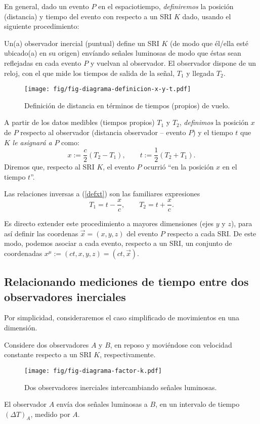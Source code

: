 En general, dado un evento $P$ en el espaciotiempo, \textit{definiremos} la posición (distancia) y tiempo del evento con respecto a un SRI $K$ dado, usando el siguiente procedimiento:

Un(a) observador inercial (puntual) define un SRI $K$ (de modo que él/ella esté  ubicado(a) en su origen) envíando señales luminosas de modo que éstas sean reflejadas en cada evento $P$ y vuelvan al observador. El observador dispone de un reloj,  con el que mide los tiempos de salida de la señal, $T_1$
y llegada $T_2$.
\begin{figure}[!h]
\centerline{\texttt{[image: fig/fig-diagrama-definicion-x-y-t.pdf]}}
 \caption{Definición de distancia en términos de tiempos (propios) de vuelo.}
\label{defdist}
\end{figure}
A partir de los datos medibles (tiempos propios) $T_1$ y $T_2$, \textit{definimos} la posición
$x$ de $P$ respecto al observador (distancia observador -- evento $P$) y el
tiempo $t$ que $K$ \textit{le asignará a} $P$ como:
\begin{equation}\label{defxt}
\boxed{x:=\frac{c}{2}(T_2-T_1), \qquad t:=\frac{1}{2}(T_2+T_1).}
\end{equation}
Diremos que, respecto al SRI $K$, el evento $P$ ocurrió ``en la posición $x$ en el tiempo $t$''.

Las relaciones inversas a (\ref{defxt}) son las familiares expresiones
\begin{equation}\label{T1T2xt}
T_1=t-\frac{x}{c}, \qquad T_2=t+\frac{x}{c}.
\end{equation}


Es directo extender este procedimiento a mayores dimensiones (ejes $y$ y $z$), para así definir las coordenas $\vec{x}=(x,y,z)$ del evento $P$ respecto a cada SRI.
De este modo, podemos asociar a cada evento, respecto a un SRI, un conjunto de
coordenadas $x^\mu:=\left(ct,x,y,z\right)=(ct,\vec{x}) $.


\subsection{Relacionando mediciones de tiempo entre dos observadores inerciales}

Por simplicidad, consideraremos el caso simplificado de movimientos en
una dimensión.

Considere dos observadores $A$ y $B$, en reposo y moviéndose con
velocidad constante respecto a un SRI $K$, respectivamente.
\begin{figure}[H]
\centerline{\texttt{[image: fig/fig-diagrama-factor-k.pdf]}}
 \caption{Dos observadores inerciales intercambiando señales luminosas.}
\label{k1}
\end{figure}
El observador $A$ envía dos señales luminosas a $B$, en un intervalo de tiempo $(\Delta T)_A$, medido por $A$.

